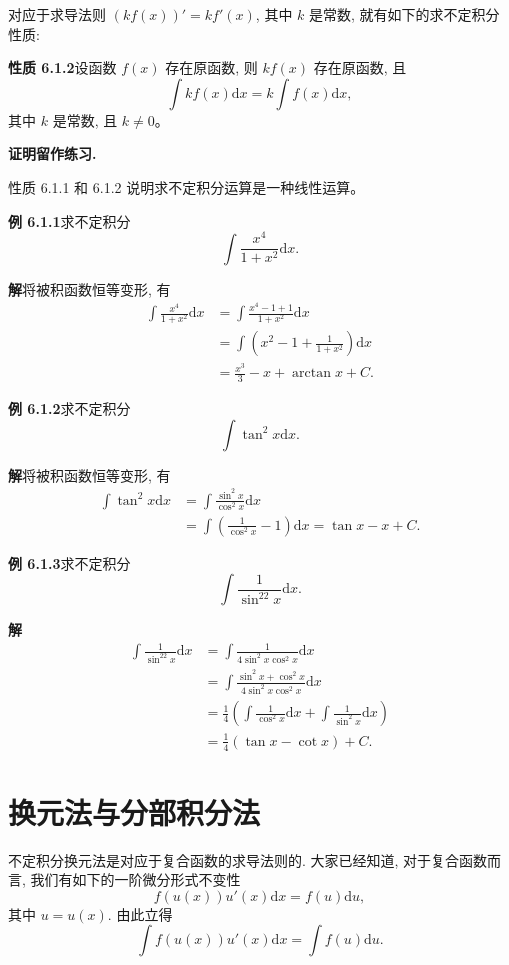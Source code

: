 \documentclass[UTF8, 12pt, fontset=fandol, oneside]{ctexart}
\begin{document}
对应于求导法则 $(kf(x))'=kf'(x)$, 其中 $k$ 是常数, 就有如下的求不定积分性质:

\noindent\textbf{性质 6.1.2}\quad 设函数 $f(x)$ 存在原函数, 则 $kf(x)$ 存在原函数, 且
\[
  \int kf(x)\mathrm dx=k\int f(x)\mathrm dx,
\]
其中 $k$ 是常数, 且 $k\ne0$。

\noindent\textbf{证明留作练习.}

性质 6.1.1 和 6.1.2 说明求不定积分运算是一种线性运算。

\noindent\textbf{例 6.1.1}\quad 求不定积分
\[
  \int\frac{x^4}{1+x^2}\mathrm dx.
\]

\noindent\textbf{解}\quad 将被积函数恒等变形, 有
\[
\begin{aligned}
  \int\frac{x^4}{1+x^2}\mathrm dx
  &=
  \int\frac{x^4-1+1}{1+x^2}\mathrm dx\\
  &=
  \int\left(x^2-1+\frac1{1+x^2}\right)\mathrm dx\\
  &=
  \frac{x^3}{3}-x+\arctan x+C.
\end{aligned}
\]

\noindent\textbf{例 6.1.2}\quad 求不定积分
\[
  \int\tan^2x\mathrm dx.
\]

\noindent\textbf{解}\quad 将被积函数恒等变形, 有
\[
\begin{aligned}
  \int\tan^2x\mathrm dx
  &=
  \int\frac{\sin^2x}{\cos^2x}\mathrm dx\\
  &=
  \int\left(\frac1{\cos^2x}-1\right)\mathrm dx
  =
  \tan x-x+C.
\end{aligned}
\]

\noindent\textbf{例 6.1.3}\quad 求不定积分
\[
  \int\frac1{\sin^22x}\mathrm dx.
\]

\noindent\textbf{解}\quad
\[
\begin{aligned}
  \int\frac1{\sin^22x}\mathrm dx
  &=
  \int\frac1{4\sin^2x\cos^2x}\mathrm dx\\
  &=
  \int\frac{\sin^2x+\cos^2x}{4\sin^2x\cos^2x}\mathrm dx\\
  &=
  \frac14\left(\int\frac1{\cos^2x}\mathrm dx+\int\frac1{\sin^2x}\mathrm dx\right)\\
  &=
  \frac14(\tan x-\cot x)+C.
\end{aligned}
\]

\section{换元法与分部积分法}

不定积分换元法是对应于复合函数的求导法则的. 大家已经知道, 对于复合函数而言, 我们有如下的一阶微分形式不变性
\[
  f(u(x))u'(x)\mathrm dx=f(u)\mathrm du,
\]
其中 $u=u(x)$. 由此立得
\begin{equation}
  \int f(u(x))u'(x)\mathrm dx=\int f(u)\mathrm du.
  \tag{6.2.1}
\end{equation}
\end{document}
